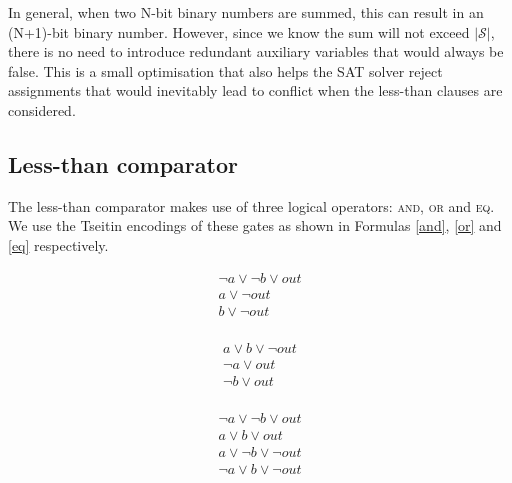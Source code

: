 \documentclass{article}
\begin{document}
\noindent In general, when two N-bit binary numbers are summed, this can result
in an (N+1)-bit binary number. However, since we know the sum will not exceed
$\vert \mathscr{S} \vert$, there is no need to introduce redundant auxiliary
variables that would always be false. This is a small optimisation that also
helps the SAT solver reject assignments that would inevitably lead to conflict
when the less-than clauses are considered.

\subsection{Less-than comparator}

The less-than comparator makes use of three logical operators: \textsc{and},
\textsc{or} and \textsc{eq}. We use the Tseitin encodings of these gates as
shown in Formulas \ref{and}, \ref{or} and \ref{eq} respectively.

\begin{multicols}{3}
  \begin{equation}
    \label{and}
    \begin{split}
      \neg{a} \lor \neg{b} \lor out \\
      a \lor \neg{out} \\
      b \lor \neg{out} \\
    \end{split}
  \end{equation}\break

  \begin{equation}
    \label{or}
    \begin{split}
      a \lor b \lor \neg{out} \\
      \neg{a} \lor out \\
      \neg{b} \lor out \\
    \end{split}
  \end{equation}\break

  \begin{equation}
    \label{eq}
    \begin{split}
      \neg{a} \lor \neg{b} \lor out \\
      a \lor b \lor out \\
      a \lor \neg{b} \lor \neg{out} \\
      \neg{a} \lor b \lor \neg{out} \\
    \end{split}
  \end{equation}\break
\end{multicols}
\end{document}
